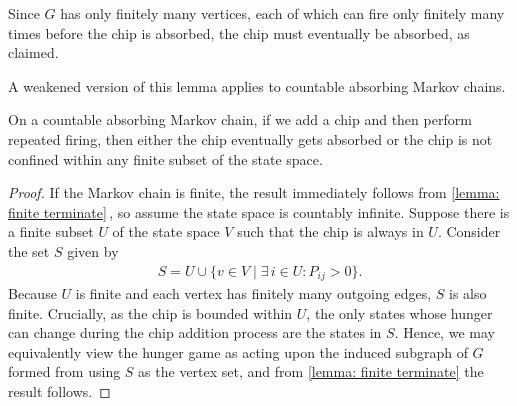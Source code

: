 Since $G$ has only finitely many vertices,
each of which can fire only finitely many times before the chip is absorbed,
the chip must eventually be absorbed, as claimed.

A weakened version of this lemma applies to countable absorbing Markov chains.

\begin{proposition}\label{proposition: countable terminate}
On a countable absorbing Markov chain, if we add a chip
and then perform repeated firing, then either the chip eventually gets absorbed
or the chip is not confined within any finite subset of the state space.
\end{proposition}
\begin{proof}
If the Markov chain is finite, the result immediately follows 
from \cref{lemma: finite terminate}\,,
so assume the state space is countably infinite.
Suppose there is a finite subset $U$ of the state space $V$
such that the chip is always in $U$.
Consider the set $S$ given by
\begin{align*}
    S = U \cup \{ v \in V \mid \exists\, i\in U : P_{ij}>0\}.
\end{align*}
Because $U$ is finite and each vertex has finitely many outgoing edges, 
$S$ is also finite.
Crucially, as the chip is bounded within $U$, 
the only states whose hunger can change during the chip addition process 
are the states in $S$.
Hence, we may equivalently view the hunger game as acting upon 
the induced subgraph of $G$ formed from using $S$ as the vertex set, 
and from \cref{lemma: finite terminate} the result follows.
\end{proof}

